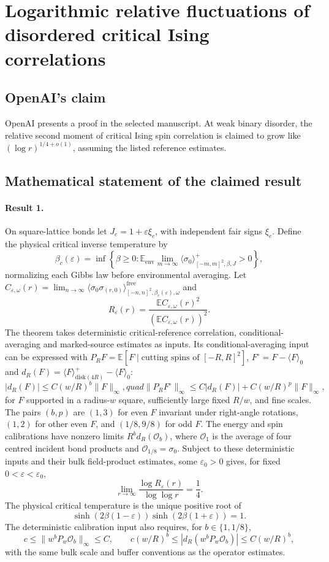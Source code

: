 \documentclass[11pt]{article}
\begin{document}
\section*{Logarithmic relative fluctuations of disordered critical Ising correlations}

\subsection{OpenAI's claim}
OpenAI presents a proof in the selected manuscript. At weak binary disorder, the relative second moment of critical Ising spin correlation is claimed to grow like $(\log r)^{1/4+o(1)}$, assuming the listed reference estimates.

\subsection{Mathematical statement of the claimed result}
\paragraph{Result 1.} On square-lattice bonds let $J_e=1+\varepsilon\xi_e$, with independent fair signs $\xi_e$. Define the physical critical inverse temperature by
\[
 \beta_c(\varepsilon)=\inf\left\{\beta\ge0:
 \mathbb E_{\mathrm{env}}\lim_{m\to\infty}\langle\sigma_0\rangle^+_{[-m,m]^2,\beta,J}>0\right\},
\]
normalizing each Gibbs law before environmental averaging. Let $C_{\varepsilon,\omega}(r)=\lim_{n\to\infty}\langle\sigma_0\sigma_{(r,0)}\rangle^{\mathrm{free}}_{[-n,n]^2,\beta_c(\varepsilon),\omega}$ and
\[
 R_\varepsilon(r)=\frac{\mathbb E C_{\varepsilon,\omega}(r)^2}{(\mathbb E C_{\varepsilon,\omega}(r))^2}.
\]
The theorem takes deterministic critical-reference correlation, conditional-averaging and marked-source estimates as inputs. Its conditional-averaging input can be expressed with $P_RF=\mathbb E[F\mid\text{cutting spins of }[-R,R]^2]$, $F^\circ=F-\langle F\rangle_0$ and $d_R(F)=\langle F\rangle^+_{\mathrm{disk}(4R)}-\langle F\rangle_0$:
\[
 |d_R(F)|\le C(w/R)^b\|F\|_\infty,quad
 \|P_RF^\circ\|_\infty\le C|d_R(F)|+C(w/R)^p\|F\|_\infty,
\]
for $F$ supported in a radius-$w$ square, sufficiently large fixed $R/w$, and fine scales. The pairs $(b,p)$ are $(1,3)$ for even $F$ invariant under right-angle rotations, $(1,2)$ for other even $F$, and $(1/8,9/8)$ for odd $F$. The energy and spin calibrations have nonzero limits $R^bd_R(\mathcal O_b)$, where $\mathcal O_1$ is the average of four centred incident bond products and $\mathcal O_{1/8}=\sigma_0$. Subject to these deterministic inputs and their bulk field-product estimates, some $\varepsilon_0>0$ gives, for fixed $0<\varepsilon<\varepsilon_0$,
\[
 \lim_{r\to\infty}\frac{\log R_\varepsilon(r)}{\log\log r}=\frac14.
\]
The physical critical temperature is the unique positive root of
\[
 \sinh(2\beta(1-\varepsilon))\sinh(2\beta(1+\varepsilon))=1.
\] The deterministic calibration input also requires, for $b\in\{1,1/8\}$,
\[
 c\le\|w^bP_w\mathcal O_b\|_\infty\le C,\qquad
 c(w/R)^b\le|d_R(w^bP_w\mathcal O_b)|\le C(w/R)^b,
\]
with the same bulk scale and buffer conventions as the operator estimates.
\end{document}
